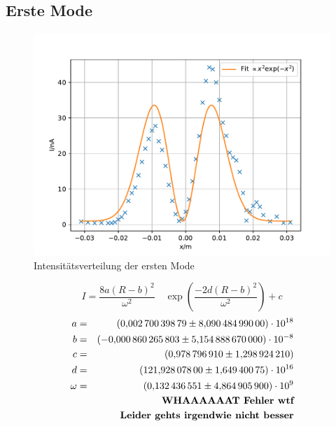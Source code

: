 %
\FloatBarrier

\subsection{Erste Mode}

\begin{figure}
  \centering
  \includegraphics[width=\textwidth]{erstemode.pdf}
  \caption{Intensitätsverteilung der ersten Mode}
  \label{fig:erstemode}
\end{figure}
\begin{equation*}
  I = \frac{8 a (R-b)^2}{\omega^2} \quad \exp{ \left( \frac{-2d(R-b)^2}{\omega^2} \right)}+c
\end{equation*}
\begin{align*}
  a      &=& \SI{ 0.00270039879 \pm 8.09048499e+18}{}\\
  b      &=& \SI{-0.000860265803 \pm 5.15488867e-08}{}\\
  c      &=& \SI{ 0.978796910 \pm 1.29892421}{}\\
  d      &=& \SI{ 121.928078 \pm 1.64940075e+16}{}\\
  \omega &=& \SI{ 0.132436551 \pm 4.86490590e+09}{}\\
   && \textbf{WHAAAAAAT Fehler wtf}\\
   && \textbf{Leider gehts irgendwie nicht besser}\\
\end{align*}
\FloatBarrier

